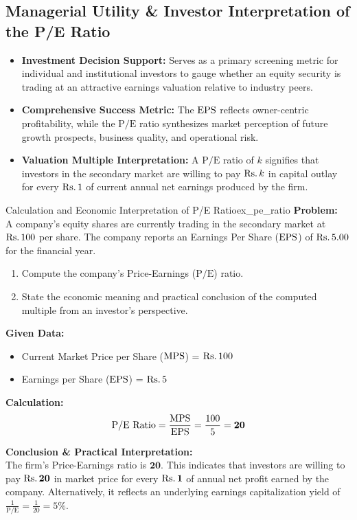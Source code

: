 \subsection{Managerial Utility \& Investor Interpretation of the P/E Ratio}
\begin{itemize}[leftmargin=*, noitemsep, topsep=2pt]
    \item \textbf{Investment Decision Support:} Serves as a primary screening metric for individual and institutional investors to gauge whether an equity security is trading at an attractive earnings valuation relative to industry peers.
    \item \textbf{Comprehensive Success Metric:} The $\operatorname{EPS}$ reflects owner-centric profitability, while the $\text{P/E}$ ratio synthesizes market perception of future growth prospects, business quality, and operational risk.
    \item \textbf{Valuation Multiple Interpretation:} A $\text{P/E}$ ratio of $k$ signifies that investors in the secondary market are willing to pay $\text{Rs.}\, k$ in capital outlay for every $\text{Rs.}\, 1$ of current annual net earnings produced by the firm.
\end{itemize}

\begin{example}{Calculation and Economic Interpretation of P/E Ratio}{ex_pe_ratio}
\textbf{Problem:} \\
A company's equity shares are currently trading in the secondary market at $\text{Rs.}\, 100$ per share. The company reports an Earnings Per Share ($\operatorname{EPS}$) of $\text{Rs.}\, 5.00$ for the financial year.
\begin{enumerate}[label=(\alph*), noitemsep]
    \item Compute the company's Price-Earnings ($\text{P/E}$) ratio.
    \item State the economic meaning and practical conclusion of the computed multiple from an investor's perspective.
\end{enumerate}

\tcbline
\textbf{Given Data:}
\begin{itemize}[noitemsep]
    \item Current Market Price per Share ($\operatorname{MPS}$) = $\text{Rs.}\, 100$
    \item Earnings per Share ($\operatorname{EPS}$) = $\text{Rs.}\, 5$
\end{itemize}

\textbf{Calculation:}
\begin{equation*}
    \text{P/E Ratio} = \frac{\operatorname{MPS}}{\operatorname{EPS}} = \frac{100}{5} = \mathbf{20}
\end{equation*}

\textbf{Conclusion \& Practical Interpretation:} \\
The firm's Price-Earnings ratio is $\mathbf{20}$. This indicates that investors are willing to pay $\mathbf{\text{Rs.}\, 20}$ in market price for every $\mathbf{\text{Rs.}\, 1}$ of annual net profit earned by the company. Alternatively, it reflects an underlying earnings capitalization yield of $\frac{1}{\text{P/E}} = \frac{1}{20} = 5\%$.
\end{example}